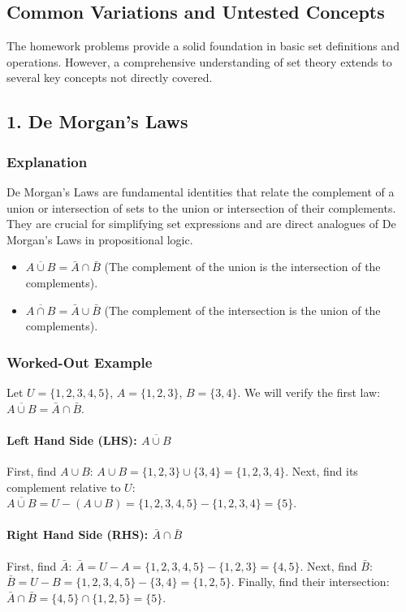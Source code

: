 \documentclass{article}
\begin{document}
\begin{itemize}
\begin{itemize}
\begin{itemize}
\begin{enumerate}
\begin{itemize}
\section{Common Variations and Untested Concepts}

The homework problems provide a solid foundation in basic set definitions and operations. However, a comprehensive understanding of set theory extends to several key concepts not directly covered.

\subsection{1. De Morgan's Laws}
\subsubsection*{Explanation}
De Morgan's Laws are fundamental identities that relate the complement of a union or intersection of sets to the union or intersection of their complements. They are crucial for simplifying set expressions and are direct analogues of De Morgan's Laws in propositional logic.
\begin{itemize}
    \item $\overline{A \cup B} = \bar{A} \cap \bar{B}$ (The complement of the union is the intersection of the complements).
    \item $\overline{A \cap B} = \bar{A} \cup \bar{B}$ (The complement of the intersection is the union of the complements).
\end{itemize}

\subsubsection*{Worked-Out Example}
Let $U = \{1, 2, 3, 4, 5\}$, $A = \{1, 2, 3\}$, $B = \{3, 4\}$.
We will verify the first law: $\overline{A \cup B} = \bar{A} \cap \bar{B}$.

\paragraph*{Left Hand Side (LHS): $\overline{A \cup B}$}
First, find $A \cup B$:
$A \cup B = \{1, 2, 3\} \cup \{3, 4\} = \{1, 2, 3, 4\}$.
Next, find its complement relative to $U$:
$\overline{A \cup B} = U - (A \cup B) = \{1, 2, 3, 4, 5\} - \{1, 2, 3, 4\} = \{5\}$.

\paragraph*{Right Hand Side (RHS): $\bar{A} \cap \bar{B}$}
First, find $\bar{A}$:
$\bar{A} = U - A = \{1, 2, 3, 4, 5\} - \{1, 2, 3\} = \{4, 5\}$.
Next, find $\bar{B}$:
$\bar{B} = U - B = \{1, 2, 3, 4, 5\} - \{3, 4\} = \{1, 2, 5\}$.
Finally, find their intersection:
$\bar{A} \cap \bar{B} = \{4, 5\} \cap \{1, 2, 5\} = \{5\}$.


\end{itemize}
\end{enumerate}
\end{itemize}
\end{itemize}
\end{itemize}
\end{document}
